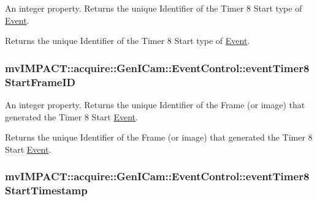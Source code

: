 An integer property. Returns the unique Identifier of the Timer 8 Start type of \hyperlink{classmv_i_m_p_a_c_t_1_1acquire_1_1_event}{Event}. 

Returns the unique Identifier of the Timer 8 Start type of \hyperlink{classmv_i_m_p_a_c_t_1_1acquire_1_1_event}{Event}. \hypertarget{classmv_i_m_p_a_c_t_1_1acquire_1_1_gen_i_cam_1_1_event_control_a3989544120c21d359c6bac197468218d}{
\subsubsection[{event\+Timer8\+Start\+Frame\+I\+D}]{ mv\+I\+M\+P\+A\+C\+T\+::acquire\+::\+Gen\+I\+Cam\+::\+Event\+Control\+::event\+Timer8\+Start\+Frame\+I\+D}}\label{classmv_i_m_p_a_c_t_1_1acquire_1_1_gen_i_cam_1_1_event_control_a3989544120c21d359c6bac197468218d}


An integer property. Returns the unique Identifier of the Frame (or image) that generated the Timer 8 Start \hyperlink{classmv_i_m_p_a_c_t_1_1acquire_1_1_event}{Event}. 

Returns the unique Identifier of the Frame (or image) that generated the Timer 8 Start \hyperlink{classmv_i_m_p_a_c_t_1_1acquire_1_1_event}{Event}. \hypertarget{classmv_i_m_p_a_c_t_1_1acquire_1_1_gen_i_cam_1_1_event_control_a365d5c871c070f33d20eab58bb73f764}{
\subsubsection[{event\+Timer8\+Start\+Timestamp}]{ mv\+I\+M\+P\+A\+C\+T\+::acquire\+::\+Gen\+I\+Cam\+::\+Event\+Control\+::event\+Timer8\+Start\+Timestamp}}\label{classmv_i_m_p_a_c_t_1_1acquire_1_1_gen_i_cam_1_1_event_control_a365d5c871c070f33d20eab58bb73f764}


